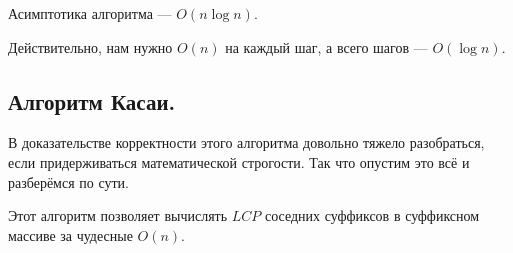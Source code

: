 \begin{remark}
        Асимптотика алгоритма --- $O(n \log n)$.
\end{remark}
Действительно, нам нужно $O(n)$ на каждый шаг, а всего шагов --- $O(\log n)$.

\subsection{Алгоритм Касаи.}
\begin{tcolorbox}[sharp corners, colback=white, colframe=white!60!black, title=Важно!]
        В доказательстве корректности этого алгоритма довольно тяжело разобраться, если придерживаться
        математической строгости. Так что опустим это всё и разберёмся по сути.
\end{tcolorbox}

Этот алгоритм позволяет вычислять $LCP$ соседних суффиксов в суффиксном массиве за чудесные $O(n)$. 

